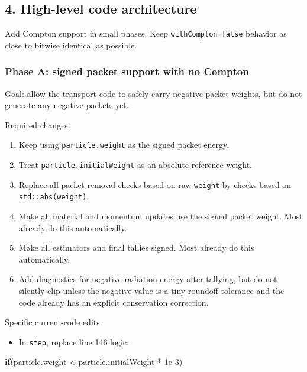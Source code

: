 \documentclass[
]{article}
\newenvironment{Shaded}{}{}
\newcommand{\ControlFlowTok}[1]{\textcolor[rgb]{0.00,0.44,0.13}{\textbf{#1}}}
\newcommand{\FloatTok}[1]{\textcolor[rgb]{0.25,0.63,0.44}{#1}}
\newcommand{\NormalTok}[1]{#1}
\newcommand{\OperatorTok}[1]{\textcolor[rgb]{0.40,0.40,0.40}{#1}}
\providecommand{\tightlist}{%
  \setlength{\itemsep}{0pt}\setlength{\parskip}{0pt}}
\begin{document}
\subsection{4. High-level code
architecture}\label{high-level-code-architecture}

Add Compton support in small phases. Keep \texttt{withCompton=false}
behavior as close to bitwise identical as possible.

\subsubsection{Phase A: signed packet support with no
Compton}\label{phase-a-signed-packet-support-with-no-compton}

Goal: allow the transport code to safely carry negative packet weights,
but do not generate any negative packets yet.

Required changes:

\begin{enumerate}
\def\labelenumi{\arabic{enumi}.}
\tightlist
\item
  Keep using \texttt{particle.weight} as the signed packet energy.
\item
  Treat \texttt{particle.initialWeight} as an absolute reference weight.
\item
  Replace all packet-removal checks based on raw \texttt{weight} by
  checks based on \texttt{std::abs(weight)}.
\item
  Make all material and momentum updates use the signed packet weight.
  Most already do this automatically.
\item
  Make all estimators and final tallies signed. Most already do this
  automatically.
\item
  Add diagnostics for negative radiation energy after tallying, but do
  not silently clip unless the negative value is a tiny roundoff
  tolerance and the code already has an explicit conservation
  correction.
\end{enumerate}

Specific current-code edits:

\begin{itemize}
\tightlist
\item
  In \texttt{step}, replace line 146 logic:
\end{itemize}

\begin{Shaded}
\begin{Highlighting}[]
\ControlFlowTok{if}\OperatorTok{(}\NormalTok{particle}\OperatorTok{.}\NormalTok{weight }\OperatorTok{\textless{}}\NormalTok{ particle}\OperatorTok{.}\NormalTok{initialWeight }\OperatorTok{*} \FloatTok{1e{-}3}\OperatorTok{)}
\end{Highlighting}
\end{Shaded}
\end{document}
